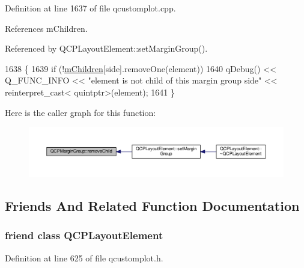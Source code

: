 Definition at line 1637 of file qcustomplot.\+cpp.



References m\+Children.



Referenced by Q\+C\+P\+Layout\+Element\+::set\+Margin\+Group().


\begin{DoxyCode}
1638 \{
1639   \textcolor{keywordflow}{if} (!\hyperlink{class_q_c_p_margin_group_a954bc89ff8958b9bb6a4a0d08ed5fc0f}{mChildren}[side].removeOne(element))
1640     qDebug() << Q\_FUNC\_INFO << \textcolor{stringliteral}{"element is not child of this margin group side"} << \textcolor{keyword}{reinterpret\_cast<}
      quintptr\textcolor{keyword}{>}(element);
1641 \}
\end{DoxyCode}


Here is the caller graph for this function\+:\nopagebreak
\begin{figure}[H]
\begin{center}
\leavevmode
\includegraphics[width=350pt]{class_q_c_p_margin_group_a20ab3286062957d99b58db683fe725b0_icgraph}
\end{center}
\end{figure}




\subsection{Friends And Related Function Documentation}
\hypertarget{class_q_c_p_margin_group_a0790750c7e7f14fdbd960d172655b42b}{}
\subsubsection[{Q\+C\+P\+Layout\+Element}]{\setlength{\rightskip}{0pt plus 5cm}friend class {\bf Q\+C\+P\+Layout\+Element}\hspace{0.3cm}{\ttfamily [friend]}}\label{class_q_c_p_margin_group_a0790750c7e7f14fdbd960d172655b42b}


Definition at line 625 of file qcustomplot.\+h.



